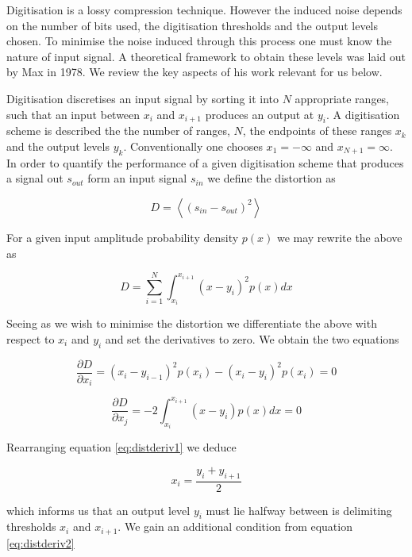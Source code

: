 \documentclass[apj]{emulateapj}
\begin{document}

Digitisation is a lossy compression technique. However the induced noise depends on the number of bits used, the digitisation thresholds and the output levels chosen. To minimise the noise induced through this process one must know the nature of input signal. A theoretical framework to obtain these levels was laid out by Max in 1978. We review the key aspects of his work relevant for us below.

Digitisation discretises an input signal by sorting it into $N$ appropriate ranges, such that an input between $x_i$ and $x_{i+1}$ produces an output at $y_i$. A digitisation scheme is described the the number of ranges, $N$, the endpoints of these ranges $x_k$ and the output levels $y_k$. Conventionally one chooses $x_{1} = -\infty$ and $x_{N+1} = \infty$. In order to quantify the performance of a given digitisation scheme that produces a signal out $s_{out}$ form an input signal $s_{in}$ we define the distortion as

\[ D = \left\langle  \left( s_{in} - s_{out} \right)^2 \right\rangle \]

For a given input amplitude probability density $p(x)$ we may rewrite the above as

\[ D = \sum_{i = 1}^N \int_{x_i}^{x_{i+1}} \left(x-y_i\right)^2 p(x) dx \]

Seeing as we wish to minimise the distortion we differentiate the above with respect to $x_i$ and $y_i$ and set the derivatives to zero. We obtain the two equations

\begin{equation} \label{eq:distderiv1}
\frac{\partial D}{\partial x_i} = \left(x_i-y_{i-1}\right)^2 p(x_i) - \left(x_i - y_i\right)^2 p(x_i) = 0
\end{equation}

\begin{equation} \label{eq:distderiv2}
\frac{\partial D}{\partial x_j} = -2 \int_{x_i}^{x_{i+1}} \left( x-y_i \right) p(x) dx = 0
\end{equation}

Rearranging equation \ref{eq:distderiv1} we deduce

\begin{equation} \label{eq:digitequalspacecondition}
x_i = \frac{y_i+y_{i+1}}{2}
\end{equation}

which informs us that an output level $y_i$ must lie halfway between is delimiting thresholds $x_i$ and $x_{i+1}$. We gain an additional condition from equation \ref{eq:distderiv2}
\end{document}
